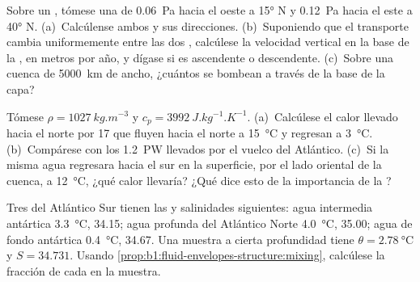 \begin{exercise}[$\star\star$]\label{exo:b1:ocean-circulation:7}
Sobre un , tómese una  de \qty{0.06}{Pa} hacia el oeste a \ang{15} N y \qty{0.12}{Pa} hacia el este a \ang{40} N. (a)~Calcúlense ambos  y sus direcciones. (b)~Suponiendo que el transporte cambia uniformemente entre las dos , calcúlese la velocidad vertical en la base de la , en metros por año, y dígase si es ascendente o descendente. (c)~Sobre una cuenca de \qty{5000}{km} de ancho, ¿cuántos  se bombean a través de la base de la capa?
\end{exercise}

\begin{exercise}[$\star\star$]\label{exo:b1:ocean-circulation:8}
Tómese $\rho = \qty{1027}{kg.m^{-3}}$ y $c_p = \qty{3992}{J.kg^{-1}.K^{-1}}$.
(a)~Calcúlese el calor llevado hacia el norte por \qty{17}{\sverdrup} que fluyen hacia el norte a \qty{15}{\celsius} y regresan a \qty{3}{\celsius}. (b)~Compárese con los \qty{1.2}{PW} llevados por el vuelco del Atlántico. (c)~Si la misma agua regresara hacia el sur en la superficie, por el lado oriental de la cuenca, a \qty{12}{\celsius}, ¿qué calor llevaría? ¿Qué dice esto de la importancia de la ?
\end{exercise}

\begin{exercise}[$\star\star$]\label{exo:b1:ocean-circulation:9}
Tres  del Atlántico Sur tienen las  y salinidades siguientes: agua intermedia antártica \qty{3.3}{\celsius}, 34.15; agua profunda del Atlántico Norte \qty{4.0}{\celsius}, 35.00; agua de fondo antártica \qty{0.4}{\celsius}, 34.67. Una muestra a cierta profundidad tiene $\theta = \qty{2.78}{\celsius}$ y $S = 34.731$. Usando \cref{prop:b1:fluid-envelopes-structure:mixing}, calcúlese la fracción de cada  en la muestra.
\end{exercise}

